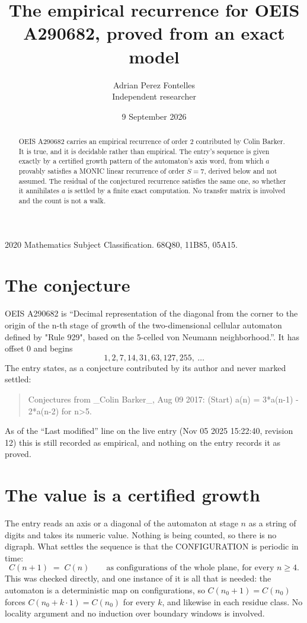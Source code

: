 \documentclass[11pt,a4paper]{article}
\title{The empirical recurrence for OEIS A290682, proved from an exact model}
\author{Adrian Perez Fontelles\\ \small Independent researcher}
\date{9 September 2026}
\theoremstyle{plain}
\theoremstyle{definition}
\begin{document}
\maketitle

\begin{abstract}
OEIS A290682 carries an empirical recurrence of order $2$ contributed by Colin Barker. It is true, and it is
decidable rather than empirical. The entry's sequence is given exactly by a certified growth pattern of the automaton's axis word, from
which $a$ provably satisfies a MONIC linear recurrence of order $S=7$, derived below and not
assumed. The residual of the conjectured recurrence satisfies the same one, so whether it
annihilates $a$ is settled by a finite exact computation. No transfer matrix is involved and
the count is not a walk.
\end{abstract}

\noindent\small 2020 Mathematics Subject Classification. 68Q80, 11B85, 05A15.\normalsize

\section{The conjecture}

OEIS A290682 is ``Decimal representation of the diagonal from the corner to the origin of the n-th stage of growth of the two-dimensional cellular automaton defined by "Rule 929", based on the 5-celled von Neumann neighborhood.''. It has offset $0$ and begins
\[
1, 2, 7, 14, 31, 63, 127, 255,\ \dots
\]
The entry states, as a conjecture contributed by its author and never marked settled:
\begin{quote}
Conjectures from \_Colin Barker\_, Aug 09 2017: (Start) a(n) = 3*a(n-1) - 2*a(n-2) for n>5.
\end{quote}
As of the ``Last modified'' line on the live entry (Nov 05 2025 15:22:40, revision 12)
this is still recorded as empirical, and nothing on the entry records it as proved.

\section{The value is a certified growth}

The entry reads an axis or a diagonal of the automaton at stage $n$ as a string of digits and
takes its numeric value. Nothing is being counted, so there is no digraph. What settles the
sequence is that the CONFIGURATION is periodic in time:
\[
C(n+1)\;=\;C(n)\qquad\text{as configurations of the whole plane, for every } n\ge 4.
\]
This was checked directly, and one instance of it is all that is needed: the automaton is a
deterministic map on configurations, so $C(n_0+1)=C(n_0)$ forces $C(n_0+k\cdot1)=C(n_0)$ for
every $k$, and likewise in each residue class. No locality argument and no induction over
boundary windows is involved.
\end{document}
